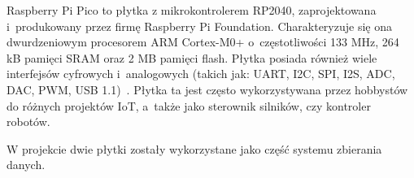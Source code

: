 Raspberry Pi Pico to płytka z mikrokontrolerem RP2040, zaprojektowana i~produkowany przez firmę Raspberry Pi Foundation.
Charakteryzuje się ona dwurdzeniowym procesorem ARM Cortex-M0+ o~częstotliwości 133 MHz, 264 kB pamięci SRAM oraz 2 MB pamięci flash.
Płytka posiada również wiele interfejsów cyfrowych i~analogowych (takich jak: UART, I2C, SPI, I2S, ADC, DAC, PWM, USB 1.1)~\cite{PICO:datasheet}.
Płytka ta jest często wykorzystywana przez hobbystów do różnych projektów IoT, a~także jako sterownik silników, czy kontroler robotów\cite{PICO:doc}.

W projekcie dwie płytki zostały wykorzystane jako część systemu zbierania danych.


